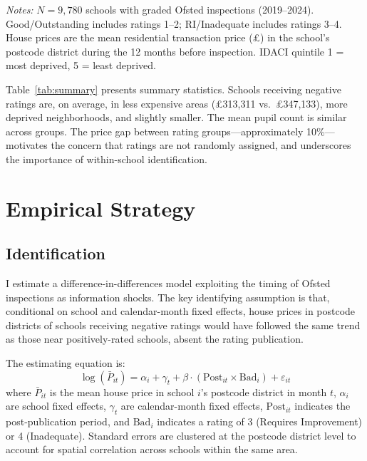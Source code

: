 \documentclass[12pt]{article}
\begin{document}
\begin{table}[H]
\centering
\caption{Summary Statistics}
\label{tab:summary}
\begin{threeparttable}
\begin{tablenotes}[flushleft]
\small
\item \textit{Notes:} $N = 9{,}780$ schools with graded Ofsted inspections (2019--2024). Good/Outstanding includes ratings 1--2; RI/Inadequate includes ratings 3--4. House prices are the mean residential transaction price (\pounds{}) in the school's postcode district during the 12 months before inspection. IDACI quintile 1 = most deprived, 5 = least deprived.
\end{tablenotes}
\end{threeparttable}
\end{table}

Table~\ref{tab:summary} presents summary statistics. Schools receiving negative ratings are, on average, in less expensive areas (\pounds313,311 vs.\ \pounds347,133), more deprived neighborhoods, and slightly smaller. The mean pupil count is similar across groups. The price gap between rating groups---approximately 10\%---motivates the concern that ratings are not randomly assigned, and underscores the importance of within-school identification.

\section{Empirical Strategy}

\subsection{Identification}

I estimate a difference-in-differences model exploiting the timing of Ofsted inspections as information shocks. The key identifying assumption is that, conditional on school and calendar-month fixed effects, house prices in postcode districts of schools receiving negative ratings would have followed the same trend as those near positively-rated schools, absent the rating publication.

The estimating equation is:
\begin{equation}
\log(\bar{P}_{it}) = \alpha_i + \gamma_t + \beta \cdot (\text{Post}_{it} \times \text{Bad}_{i}) + \varepsilon_{it}
\label{eq:did}
\end{equation}
where $\bar{P}_{it}$ is the mean house price in school $i$'s postcode district in month $t$, $\alpha_i$ are school fixed effects, $\gamma_t$ are calendar-month fixed effects, $\text{Post}_{it}$ indicates the post-publication period, and $\text{Bad}_i$ indicates a rating of 3 (Requires Improvement) or 4 (Inadequate). Standard errors are clustered at the postcode district level to account for spatial correlation across schools within the same area.
\end{document}
